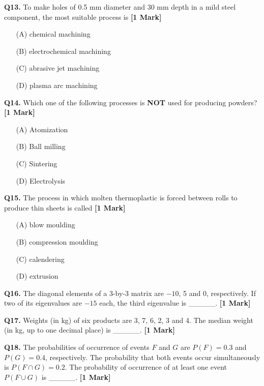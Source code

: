 \documentclass[11pt]{article}
\newcommand{\questiona}[2]{
    \noindent\textbf{Q#2.} #1 \hfill \textbf{[1 Mark]}
}
\begin{document}
\questiona{To make holes of 0.5 mm diameter and 30 mm depth in a mild steel component, the most suitable process is}{13}
\begin{enumerate}
    \item[(A)] chemical machining
    \item[(B)] electrochemical machining
    \item[(C)] abrasive jet machining
    \item[(D)] plasma arc machining
\end{enumerate}
\vspace{0.5cm}

\questiona{Which one of the following processes is \textbf{NOT} used for producing powders?}{14}
\begin{enumerate}
    \item[(A)] Atomization
    \item[(B)] Ball milling
    \item[(C)] Sintering
    \item[(D)] Electrolysis
\end{enumerate}
\vspace{0.5cm}

\questiona{The process in which molten thermoplastic is forced between rolls to produce thin sheets is called}{15}
\begin{enumerate}
    \item[(A)] blow moulding
    \item[(B)] compression moulding
    \item[(C)] calendering
    \item[(D)] extrusion
\end{enumerate}
\vspace{0.5cm}

\questiona{The diagonal elements of a 3-by-3 matrix are \(-10\), 5 and 0, respectively. If two of its eigenvalues are \(-15\) each, the third eigenvalue is \_\_\_\_\_.}{16}
\vspace{0.5cm}

\questiona{Weights (in kg) of six products are 3, 7, 6, 2, 3 and 4. The median weight (in kg, up to one decimal place) is \_\_\_\_\_.}{17}
\vspace{0.5cm}

\questiona{The probabilities of occurrence of events \( F \) and \( G \) are \( P(F) = 0.3 \) and \( P(G) = 0.4 \), respectively. The probability that both events occur simultaneously is \( P(F \cap G) = 0.2 \). The probability of occurrence of at least one event \( P(F \cup G) \) is \_\_\_\_\_.}{18}
\vspace{0.5cm}
\end{document}
